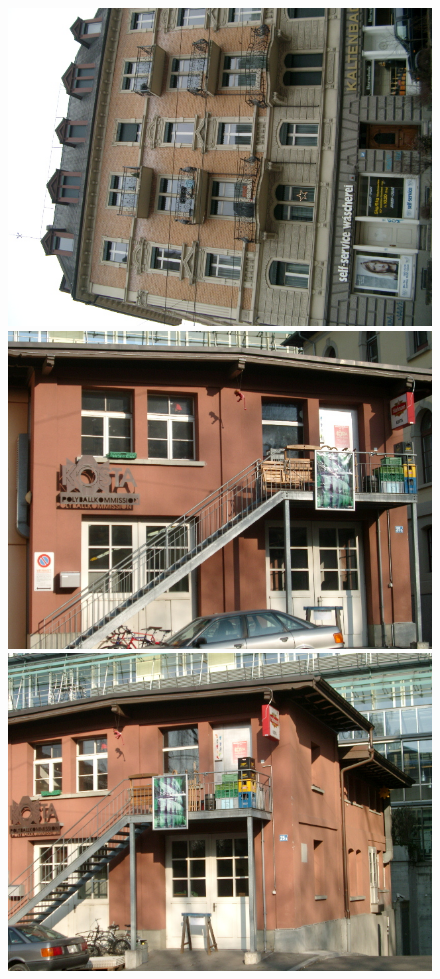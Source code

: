\documentclass[twocolumn]{article}
\begin{document}
\begin{figure}
{				\includegraphics[scale=0.123]{zubud4.png}
				\includegraphics[scale=0.123]{zubud5.png}
				\includegraphics[scale=0.123]{zubud6.png}
			}


\end{figure}
\end{document}
